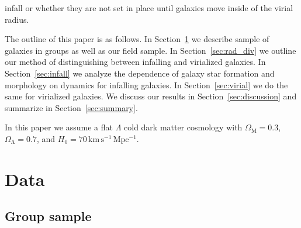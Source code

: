 \documentclass[a4paper,fleqn,usenatbib]{mnras}
\begin{document}
infall or whether they are not set in place until galaxies move inside
of the virial radius.
\par
The outline of this paper is as follows.  In Section~\ref{sec:data} we
describe sample of galaxies in groups as well as our field sample.  In
Section~\ref{sec:rad_div} we outline our method of distinguishing
between infalling and virialized galaxies.  In
Section~\ref{sec:infall} we analyze the dependence of galaxy star
formation and morphology on dynamics for infalling galaxies.  In
Section~\ref{sec:virial} we do the same for virialized galaxies.  We
discuss our results in Section~\ref{sec:discussion} and summarize in
Section~\ref{sec:summary}.
\par
In this paper we assume a flat $\Lambda$ cold dark matter cosmology
with $\Omega_\mathrm{M} = 0.3$, $\Omega_\mathrm{\Lambda} = 0.7$, and
$H_0 = 70\,\mathrm{km}\,\mathrm{s^{-1}}\,\mathrm{Mpc^{-1}}$.


\section{Data}
\label{sec:data}

\subsection{Group sample}
\label{sec:data_group}
\end{document}
